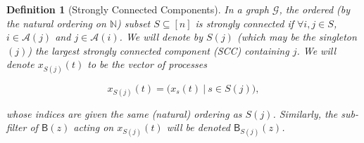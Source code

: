 \documentclass{statsoc}
\newcounter{definition}
\def\gcg{\mathcal{G}}  %
\def\B{\mathsf{B}}  %
\newcommand{\anc}[1]{\mathcal{A}(#1)}  %
\newtheorem{definition}{Definition}
\def\N{\mathbb{N}}  %
\begin{document}
\begin{definition}[Strongly Connected Components]
  \label{def:scc}
  In a graph $\gcg$, the \textit{ordered} (by the natural ordering on
  $\N$) subset $S \subseteq [n]$ is \textit{strongly connected} if
  $\forall i, j \in S$, $i \in \anc{j}$ and $j \in \anc{i}$.  We will
  denote by $S(j)$ (which may be the singleton $(j)$) the largest
  strongly connected component (SCC) containing $j$.  We will denote
  $x_{S(j)}(t)$ to be the vector of processes

  \[
    x_{S(j)}(t) = \big(x_s(t)\ |\ s \in S(j)\big),
  \]

  whose indices are given the same (natural) ordering as $S(j)$.
  Similarly, the sub-filter of $\B(z)$ acting on $x_{S(j)}(t)$ will be
  denoted $\B_{S(j)}(z)$.
\end{definition}
\end{document}
